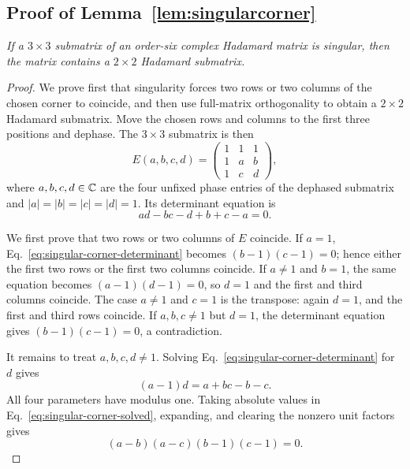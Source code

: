 \subsection{{Proof of Lemma~\ref{lem:singularcorner}}}
\label{sec:supp-singular-corner}

{\emph{If a $3\times3$ submatrix of an order-six complex Hadamard matrix is singular, then the matrix contains a $2\times2$ Hadamard submatrix.}}

\begin{proof}
We prove first that singularity forces two rows or two columns of the chosen corner to coincide, and then use full-matrix orthogonality to obtain a $2\times2$ Hadamard submatrix. Move the chosen rows and columns to the first three positions and dephase. The $3\times3$ submatrix is then
\begin{equation}
E(a,b,c,d)=\begin{pmatrix}1&1&1\\1&a&b\\1&c&d\end{pmatrix},
\label{eq:supp-singular-corner-form}
\end{equation}
where $a,b,c,d\in\mathbb C$ are the four unfixed phase entries of the dephased submatrix and $|a|=|b|=|c|=|d|=1$.  Its determinant equation is
\begin{equation}
ad-bc-d+b+c-a=0.
\label{eq:singular-corner-determinant}
\end{equation}

We first prove that two rows or two columns of $E$ coincide.  If $a=1$, Eq.~\eqref{eq:singular-corner-determinant} becomes $(b-1)(c-1)=0$; hence either the first two rows or the first two columns coincide. If $a\ne1$ and $b=1$, the same equation becomes $(a-1)(d-1)=0$, so $d=1$ and the first and third columns coincide. The case $a\ne1$ and $c=1$ is the transpose: again $d=1$, and the first and third rows coincide. If $a,b,c\ne1$ but $d=1$, the determinant equation gives $(b-1)(c-1)=0$, a contradiction.

It remains to treat $a,b,c,d\ne1$. Solving Eq.~\eqref{eq:singular-corner-determinant} for $d$ gives
\begin{equation}
(a-1)d=a+bc-b-c.
\label{eq:singular-corner-solved}
\end{equation}
All four parameters have modulus one. Taking absolute values in Eq.~\eqref{eq:singular-corner-solved}, expanding, and clearing the nonzero unit factors gives
\begin{equation}
(a-b)(a-c)(b-1)(c-1)=0.
\label{eq:singular-corner-factor}
\end{equation}


\end{proof}
